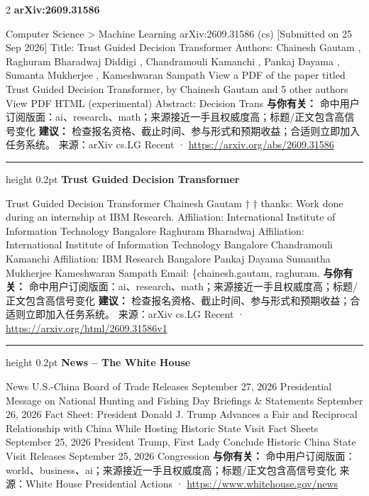 \documentclass[10.5pt]{ctexart}
\begin{document}
\begin{multicols}{2}
{\large\bfseries arXiv:2609.31586}\par
Computer Science > Machine Learning arXiv:2609.31586 (cs) [Submitted on 25 Sep 2026] Title: Trust Guided Decision Transformer Authors: Chainesh Gautam , Raghuram Bharadwaj Diddigi , Chandramouli Kamanchi , Pankaj Dayama , Sumanta Mukherjee , Kameshwaran Sampath View a PDF of the paper titled Trust Guided Decision Transformer, by Chainesh Gautam and 5 other authors View PDF HTML (experimental) Abstract: Decision Trans
\textbf{与你有关：} 命中用户订阅版面：ai、research、math；来源接近一手且权威度高；标题/正文包含高信号变化
\textbf{建议：} 检查报名资格、截止时间、参与形式和预期收益；合适则立即加入任务系统。
{\footnotesize\color{ormuted} 来源：arXiv cs.LG Recent · \url{https://arxiv.org/abs/2609.31586}}
\vspace{2mm}
\hrule height 0.2pt
\vspace{2mm}
{\large\bfseries Trust Guided Decision Transformer}\par
Trust Guided Decision Transformer Chainesh Gautam † † thanks: Work done during an internship at IBM Research. Affiliation: International Institute of Information Technology Bangalore Raghuram Bharadwaj Affiliation: International Institute of Information Technology Bangalore Chandramouli Kamanchi Affiliation: IBM Research Bangalore Pankaj Dayama Sumantha Mukherjee Kameshwaran Sampath Email: \{chainesh.gautam, raghuram.
\textbf{与你有关：} 命中用户订阅版面：ai、research、math；来源接近一手且权威度高；标题/正文包含高信号变化
\textbf{建议：} 检查报名资格、截止时间、参与形式和预期收益；合适则立即加入任务系统。
{\footnotesize\color{ormuted} 来源：arXiv cs.LG Recent · \url{https://arxiv.org/html/2609.31586v1}}
\vspace{2mm}
\hrule height 0.2pt
\vspace{2mm}
{\large\bfseries News – The White House}\par
News U.S.-China Board of Trade Releases September 27, 2026 Presidential Message on National Hunting and Fishing Day Briefings \& Statements September 26, 2026 Fact Sheet: President Donald J. Trump Advances a Fair and Reciprocal Relationship with China While Hosting Historic State Visit Fact Sheets September 25, 2026 President Trump, First Lady Conclude Historic China State Visit Releases September 25, 2026 Congression
\textbf{与你有关：} 命中用户订阅版面：world、business、ai；来源接近一手且权威度高；标题/正文包含高信号变化
{\footnotesize\color{ormuted} 来源：White House Presidential Actions · \url{https://www.whitehouse.gov/news}}

\end{multicols}
\end{document}
